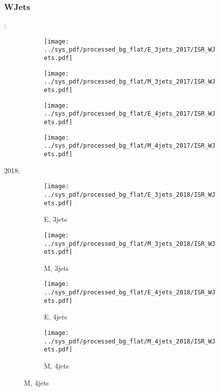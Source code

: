 \documentclass{beamer}
\begin{document}
\begin{frame}
\frametitle{WJets}
\fontsize{5}{1}:
\begin{figure}
\centering
\begin{subfigure}[b]{0.24\textwidth}
\texttt{[image: ../sys\_pdf/processed\_bg\_flat/E\_3jets\_2017/ISR\_WJets.pdf]}
\end{subfigure}
\begin{subfigure}[b]{0.24\textwidth}
\texttt{[image: ../sys\_pdf/processed\_bg\_flat/M\_3jets\_2017/ISR\_WJets.pdf]}
\end{subfigure}
\begin{subfigure}[b]{0.24\textwidth}
\texttt{[image: ../sys\_pdf/processed\_bg\_flat/E\_4jets\_2017/ISR\_WJets.pdf]}
\end{subfigure}
\begin{subfigure}[b]{0.24\textwidth}
\texttt{[image: ../sys\_pdf/processed\_bg\_flat/M\_4jets\_2017/ISR\_WJets.pdf]}
\end{subfigure}
\end{figure}
2018:
\begin{figure}
\centering
\begin{subfigure}[b]{0.24\textwidth}
\texttt{[image: ../sys\_pdf/processed\_bg\_flat/E\_3jets\_2018/ISR\_WJets.pdf]}
\captionsetup{font=tiny}
\caption{E, 3jets}
\end{subfigure}
\begin{subfigure}[b]{0.24\textwidth}
\texttt{[image: ../sys\_pdf/processed\_bg\_flat/M\_3jets\_2018/ISR\_WJets.pdf]}
\captionsetup{font=tiny}
\caption{M, 3jets}
\end{subfigure}
\begin{subfigure}[b]{0.24\textwidth}
\texttt{[image: ../sys\_pdf/processed\_bg\_flat/E\_4jets\_2018/ISR\_WJets.pdf]}
\captionsetup{font=tiny}
\caption{E, 4jets}
\end{subfigure}
\begin{subfigure}[b]{0.24\textwidth}
\texttt{[image: ../sys\_pdf/processed\_bg\_flat/M\_4jets\_2018/ISR\_WJets.pdf]}
\captionsetup{font=tiny}
\caption{M, 4jets}
\end{subfigure}
\end{figure}
\end{frame}
\end{document}
